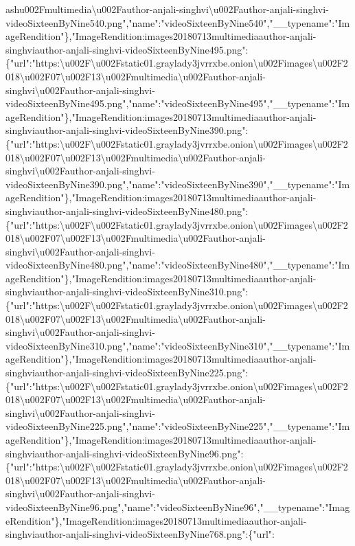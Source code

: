 ash{}u002Fmultimedia\textbackslash{}u002Fauthor-anjali-singhvi\textbackslash{}u002Fauthor-anjali-singhvi-videoSixteenByNine540.png","name":"videoSixteenByNine540","\_\_typename":"ImageRendition"\},"ImageRendition:images20180713multimediaauthor-anjali-singhviauthor-anjali-singhvi-videoSixteenByNine495.png":\{"url":"https:\textbackslash{}u002F\textbackslash{}u002Fstatic01.graylady3jvrrxbe.onion\textbackslash{}u002Fimages\textbackslash{}u002F2018\textbackslash{}u002F07\textbackslash{}u002F13\textbackslash{}u002Fmultimedia\textbackslash{}u002Fauthor-anjali-singhvi\textbackslash{}u002Fauthor-anjali-singhvi-videoSixteenByNine495.png","name":"videoSixteenByNine495","\_\_typename":"ImageRendition"\},"ImageRendition:images20180713multimediaauthor-anjali-singhviauthor-anjali-singhvi-videoSixteenByNine390.png":\{"url":"https:\textbackslash{}u002F\textbackslash{}u002Fstatic01.graylady3jvrrxbe.onion\textbackslash{}u002Fimages\textbackslash{}u002F2018\textbackslash{}u002F07\textbackslash{}u002F13\textbackslash{}u002Fmultimedia\textbackslash{}u002Fauthor-anjali-singhvi\textbackslash{}u002Fauthor-anjali-singhvi-videoSixteenByNine390.png","name":"videoSixteenByNine390","\_\_typename":"ImageRendition"\},"ImageRendition:images20180713multimediaauthor-anjali-singhviauthor-anjali-singhvi-videoSixteenByNine480.png":\{"url":"https:\textbackslash{}u002F\textbackslash{}u002Fstatic01.graylady3jvrrxbe.onion\textbackslash{}u002Fimages\textbackslash{}u002F2018\textbackslash{}u002F07\textbackslash{}u002F13\textbackslash{}u002Fmultimedia\textbackslash{}u002Fauthor-anjali-singhvi\textbackslash{}u002Fauthor-anjali-singhvi-videoSixteenByNine480.png","name":"videoSixteenByNine480","\_\_typename":"ImageRendition"\},"ImageRendition:images20180713multimediaauthor-anjali-singhviauthor-anjali-singhvi-videoSixteenByNine310.png":\{"url":"https:\textbackslash{}u002F\textbackslash{}u002Fstatic01.graylady3jvrrxbe.onion\textbackslash{}u002Fimages\textbackslash{}u002F2018\textbackslash{}u002F07\textbackslash{}u002F13\textbackslash{}u002Fmultimedia\textbackslash{}u002Fauthor-anjali-singhvi\textbackslash{}u002Fauthor-anjali-singhvi-videoSixteenByNine310.png","name":"videoSixteenByNine310","\_\_typename":"ImageRendition"\},"ImageRendition:images20180713multimediaauthor-anjali-singhviauthor-anjali-singhvi-videoSixteenByNine225.png":\{"url":"https:\textbackslash{}u002F\textbackslash{}u002Fstatic01.graylady3jvrrxbe.onion\textbackslash{}u002Fimages\textbackslash{}u002F2018\textbackslash{}u002F07\textbackslash{}u002F13\textbackslash{}u002Fmultimedia\textbackslash{}u002Fauthor-anjali-singhvi\textbackslash{}u002Fauthor-anjali-singhvi-videoSixteenByNine225.png","name":"videoSixteenByNine225","\_\_typename":"ImageRendition"\},"ImageRendition:images20180713multimediaauthor-anjali-singhviauthor-anjali-singhvi-videoSixteenByNine96.png":\{"url":"https:\textbackslash{}u002F\textbackslash{}u002Fstatic01.graylady3jvrrxbe.onion\textbackslash{}u002Fimages\textbackslash{}u002F2018\textbackslash{}u002F07\textbackslash{}u002F13\textbackslash{}u002Fmultimedia\textbackslash{}u002Fauthor-anjali-singhvi\textbackslash{}u002Fauthor-anjali-singhvi-videoSixteenByNine96.png","name":"videoSixteenByNine96","\_\_typename":"ImageRendition"\},"ImageRendition:images20180713multimediaauthor-anjali-singhviauthor-anjali-singhvi-videoSixteenByNine768.png":\{"url":